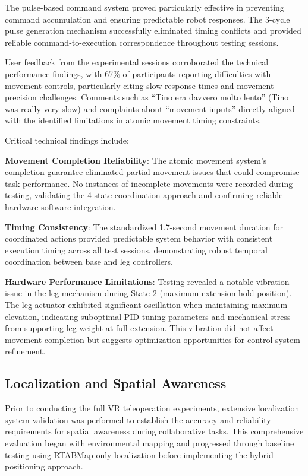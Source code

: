 The pulse-based command system proved particularly effective in preventing command accumulation and ensuring predictable robot responses. The 3-cycle pulse generation mechanism successfully eliminated timing conflicts and provided reliable command-to-execution correspondence throughout testing sessions.

User feedback from the experimental sessions corroborated the technical performance findings, with 67\% of participants reporting difficulties with movement controls, particularly citing slow response times and movement precision challenges. Comments such as ``Tino era davvero molto lento'' (Tino was really very slow) and complaints about ``movement inputs'' directly aligned with the identified limitations in atomic movement timing constraints.

Critical technical findings include:

\textbf{Movement Completion Reliability}: The atomic movement system's completion guarantee eliminated partial movement issues that could compromise task performance. No instances of incomplete movements were recorded during testing, validating the 4-state coordination approach and confirming reliable hardware-software integration.

\textbf{Timing Consistency}: The standardized 1.7-second movement duration for coordinated actions provided predictable system behavior with consistent execution timing across all test sessions, demonstrating robust temporal coordination between base and leg controllers.

\textbf{Hardware Performance Limitations}: Testing revealed a notable vibration issue in the leg mechanism during State 2 (maximum extension hold position). The leg actuator exhibited significant oscillation when maintaining maximum elevation, indicating suboptimal PID tuning parameters and mechanical stress from supporting leg weight at full extension. This vibration did not affect movement completion but suggests optimization opportunities for control system refinement.

\subsection{Localization and Spatial Awareness}

Prior to conducting the full VR teleoperation experiments, extensive localization system validation was performed to establish the accuracy and reliability requirements for spatial awareness during collaborative tasks. This comprehensive evaluation began with environmental mapping and progressed through baseline testing using RTABMap-only localization before implementing the hybrid positioning approach.

